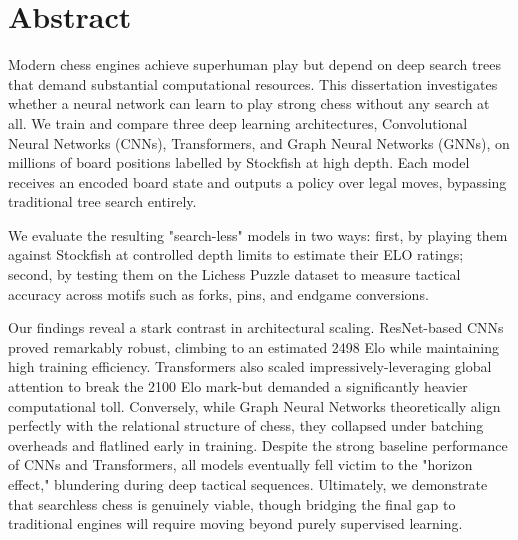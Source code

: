 
\chapter*{Abstract}

Modern chess engines achieve superhuman play but depend on deep search trees
that demand substantial computational resources. This dissertation investigates whether
a neural network can learn to play strong chess without any search at all. We
train and compare three deep learning architectures, Convolutional Neural
Networks (CNNs), Transformers, and Graph Neural Networks (GNNs), on millions of
board positions labelled by Stockfish at high depth. Each model receives an
encoded board state and outputs a policy over legal moves, bypassing
traditional tree search entirely.

We evaluate the resulting "search-less" models in two ways: first, by playing
them against Stockfish at controlled depth limits to estimate their ELO
ratings; second, by testing them on the Lichess Puzzle dataset to measure
tactical accuracy across motifs such as forks, pins, and endgame conversions.

Our findings reveal a stark contrast in architectural scaling. ResNet-based CNNs proved remarkably robust, climbing to an estimated 2498 Elo while maintaining high training efficiency. Transformers also scaled impressively-leveraging global attention to break the 2100 Elo mark-but demanded a significantly heavier computational toll. Conversely, while Graph Neural Networks theoretically align perfectly with the relational structure of chess, they collapsed under batching overheads and flatlined early in training. Despite the strong baseline performance of CNNs and Transformers, all models eventually fell victim to the "horizon effect," blundering during deep tactical sequences. Ultimately, we demonstrate that searchless chess is genuinely viable, though bridging the final gap to traditional engines will require moving beyond purely supervised learning.
